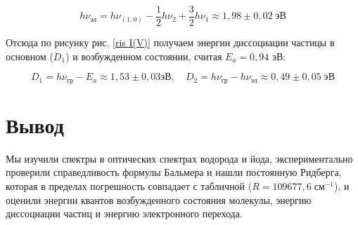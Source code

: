 \documentclass[12pt]{kiarticle} %
\begin{document}
	\begin{equation}\label{}
	h \nu_{эл} = h \nu_(1,0) - \dfrac{1}{2} h\nu_2 + \dfrac{3}{2}h\nu_1 \approx 1,98  \pm 0,02 \; эВ
	\end{equation}
	
	Отсюда по рисунку рис. \ref{ris I(V)} получаем энергии диссоциации частицы в основном ($ D_1 $) и возбужденном состоянии, считая $ E_a = 0,94 $ эВ:
	
	\begin{equation}\label{}
	D_1 = h \nu_{гр} - E_a \approx 1,53 \pm 0,03 эВ, \quad D_2 = h \nu_{гр} - h \nu_{эл} \approx 0,49 \pm 0,05 \; эВ
	\end{equation}
	
	\section{Вывод }
	
	Мы изучили спектры в оптических спектрах водорода и йода, экспериментально проверили справедливость формулы Бальмера и нашли постоянную Ридберга, которая в пределах погрешность совпадает с табличной ($ R = 109 677,6 \; см^{-1} $), и оценили энергии квантов возбужденного состояния молекулы, энергию диссоциации частиц и энергию электронного перехода.
	
\end{document}
